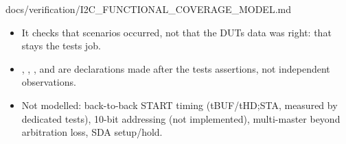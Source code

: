 \begin{relocated}{docs/verification/I2C_FUNCTIONAL_COVERAGE_MODEL.md}
\begin{itemize}
\tightlist
\item
  It checks that scenarios occurred, not that the DUT\textquotesingle s
  data was right: that stays the tests\textquotesingle{} job.
\item
  , , ,
   and  are declarations made after the
  test\textquotesingle s assertions, not independent observations.
\item
  Not modelled: back-to-back START timing (tBUF/\allowbreak{}tHD;STA,
  measured by dedicated tests), 10-bit addressing (not implemented),
  multi-master beyond arbitration loss, SDA setup/\allowbreak{}hold.
\end{itemize}
\end{relocated}

